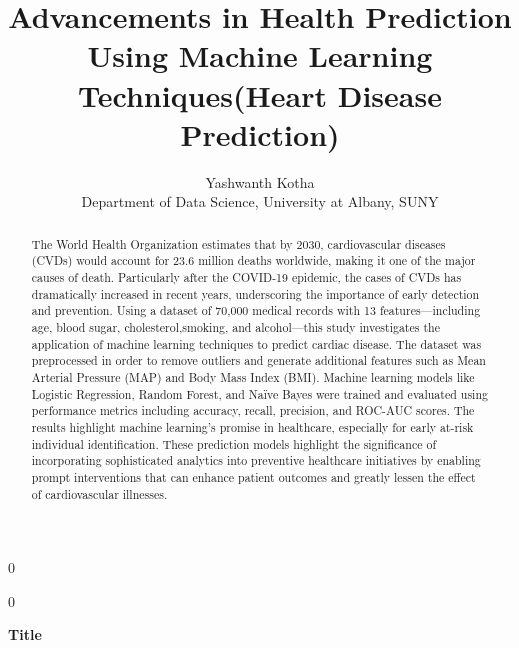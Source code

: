 \documentclass[12pt]{article}
\newcommand{\blind}{0}
\begin{document}
%

\def\spacingset#1{\renewcommand{\baselinestretch}%
{#1}\small\normalsize} \spacingset{1}



\blind
{
  \title{\bf Advancements in Health Prediction Using Machine Learning
Techniques(Heart Disease Prediction)}
  \author{Yashwanth Kotha\hspace{.2cm}\\
    Department of Data Science, University at Albany, SUNY\\
    }
  \maketitle
} \fi

\blind
{
  \bigskip
  \bigskip
  \bigskip
  \begin{center}
    {\LARGE\bf Title}
\end{center}
  \medskip
} \fi

\bigskip
\begin{abstract}
The World Health Organization estimates that by 2030, cardiovascular diseases (CVDs) would account for 23.6 million deaths worldwide, making it one of the major causes of death. Particularly after the COVID-19 epidemic, the cases of CVDs has dramatically increased in recent years, underscoring the importance of early detection and prevention. Using a dataset of 70,000 medical records with 13 features—including age, blood sugar, cholesterol,smoking, and alcohol—this study investigates the application of machine learning techniques to predict cardiac disease. The dataset was preprocessed in order to remove outliers and generate additional features such as Mean Arterial Pressure (MAP) and Body Mass Index (BMI). Machine learning models like Logistic Regression, Random Forest, and Naïve Bayes were trained and evaluated using performance metrics including accuracy, recall, precision, and ROC-AUC scores. The results highlight machine learning's promise in healthcare, especially for early at-risk individual identification. These prediction models highlight the significance of incorporating sophisticated analytics into preventive healthcare initiatives by enabling prompt interventions that can enhance patient outcomes and greatly lessen the effect of cardiovascular illnesses.



\end{abstract}
\end{document}
